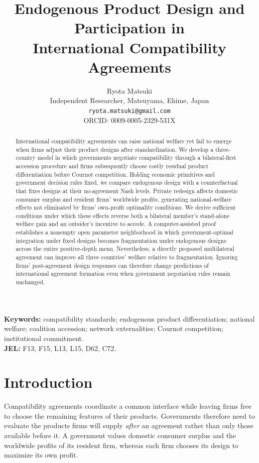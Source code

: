 \documentclass[11pt,a4paper]{article}
\title{Endogenous Product Design and Participation in\\ International Compatibility Agreements}
\author{Ryota Matsuki\\Independent Researcher, Matsuyama, Ehime, Japan\\\texttt{ryota.matsuki@gmail.com}\\ORCID: 0009-0005-2329-531X}
\date{}
\theoremstyle{remark}\newtheorem{remark}[theorem]{Remark}
\begin{document}
\maketitle
\begin{abstract}
International compatibility agreements can raise national welfare yet fail to emerge when firms adjust their product designs after standardization. We develop a three-country model in which governments negotiate compatibility through a bilateral-first accession procedure and firms subsequently choose costly residual product differentiation before Cournot competition. Holding economic primitives and government decision rules fixed, we compare endogenous design with a counterfactual that fixes designs at their no-agreement Nash levels. Private redesign affects domestic consumer surplus and resident firms' worldwide profits, generating national-welfare effects not eliminated by firms' own-profit optimality conditions. We derive sufficient conditions under which these effects reverse both a bilateral member's stand-alone welfare gain and an outsider's incentive to accede. A computer-assisted proof establishes a nonempty open parameter neighborhood in which government-optimal integration under fixed designs becomes fragmentation under endogenous designs across the entire positive-depth menu. Nevertheless, a directly proposed multilateral agreement can improve all three countries' welfare relative to fragmentation. Ignoring firms' post-agreement design responses can therefore change predictions of international agreement formation even when government negotiation rules remain unchanged.
\end{abstract}
\noindent\textbf{Keywords:} compatibility standards; endogenous product differentiation; national welfare; coalition accession; network externalities; Cournot competition; institutional commitment.\\
\textbf{JEL:} F13, F15, L13, L15, D62, C72.

\section{Introduction}

Compatibility agreements coordinate a common interface while leaving firms free to choose the remaining features of their products. Governments therefore need to evaluate the products firms will supply \emph{after} an agreement rather than only those available before it. A government values domestic consumer surplus and the worldwide profits of its resident firm, whereas each firm chooses its design to maximize its own profit.
\end{document}
